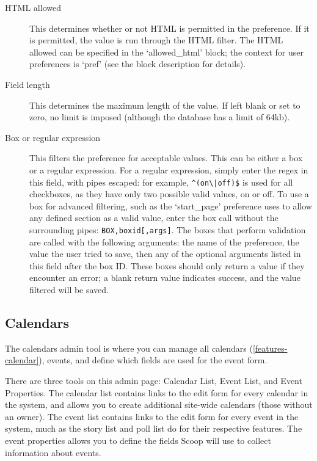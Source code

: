 \begin{description}
\item[HTML allowed] This determines whether or not HTML is permitted in the preference. If it is permitted, the value is run through the HTML filter. The HTML allowed can be specified in the `allowed\_html' block; the context for user preferences is `pref' (see the block description for details).
\item[Field length] This determines the maximum length of the value. If left blank or set to zero, no limit is imposed (although the database has a limit of 64kb).
\item[Box or regular expression] This filters the preference for acceptable values. This can be either a box or a regular expression. For a regular expression, simply enter the regex in this field, with pipes escaped: for example, \verb!^(on\|off)$! is used for all checkboxes, as they have only two possible valid values, on or off. To use a box for advanced filtering, such as the `start\_page' preference uses to allow any defined section as a valid value, enter the box call without the surrounding pipes: \verb!BOX,boxid[,args]!. The boxes that perform validation are called with the following arguments: the name of the preference, the value the user tried to save, then any of the optional arguments listed in this field after the box ID. These boxes should only return a value if they encounter an error; a blank return value indicates success, and the value filtered will be saved.
\end{description}

\subsection{Calendars}
\label{admin-tools-calendars}

The calendars admin tool is where you can manage all calendars (\ref{features-calendar}), events, and define which fields are used for the event form.

There are three tools on this admin page: Calendar List, Event List, and Event Properties. The calendar list contains links to the edit form for every calendar in the system, and allows you to create additional site-wide calendars (those without an owner). The event list contains links to the edit form for every event in the system, much as the story list and poll list do for their respective features. The event properties allows you to define the fields Scoop will use to collect information about events.

